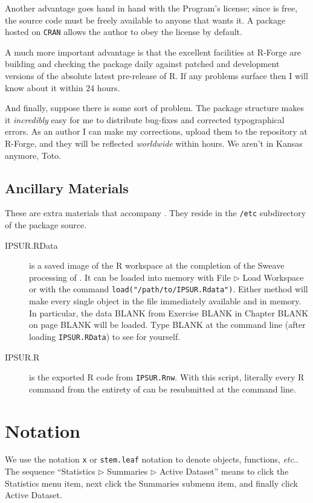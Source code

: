 \documentclass[captions=tableheading]{scrbook}
\begin{document}
Another advantage goes hand in hand with the Program's license; since \IPSUR is free, the source code must be freely available to anyone that wants it. A package hosted on \texttt{CRAN} allows the author to obey the license by default.

A much more important advantage is that the excellent facilities at \textsf{R}-Forge are building and checking the package daily against patched and development versions of the absolute latest pre-release of \textsf{R}. If any problems surface then I will know about it within 24 hours.

And finally, suppose there is some sort of problem. The package structure makes it \emph{incredibly} easy for me to distribute bug-fixes and corrected typographical errors. As an author I can make my corrections, upload them to the repository at \textsf{R}-Forge, and they will be reflected \emph{worldwide} within hours. We aren't in Kansas anymore, Toto.

\subsection*{Ancillary Materials}

These are extra materials that accompany \IPSUR. They reside in the \texttt{/etc} subdirectory of the package source. 

\begin{description}
\item[IPSUR.RData] is a saved image of the \textsf{R} workspace at the completion of the Sweave processing of \IPSUR. It can be loaded into memory with \textsf{File} $\triangleright$ \textsf{Load Workspace} or with the command \texttt{load("/path/to/IPSUR.Rdata")}. Either method will make every single object in the file immediately available and in memory. In particular, the data BLANK from Exercise BLANK in Chapter BLANK on page BLANK will be loaded. Type BLANK at the command line (after loading \texttt{IPSUR.RData}) to see for yourself.
\item[IPSUR.R] is the exported \textsf{R} code from \texttt{IPSUR.Rnw}. With this script, literally every \textsf{R} command from the entirety of \IPSUR can be resubmitted at the command line.
\end{description}

\section*{Notation}

We use the notation \texttt{x} or \texttt{stem.leaf} notation to denote objects, functions, \emph{etc}.. The sequence ``\textsf{Statistics} \textsf{$\triangleright$} \textsf{Summaries} \textsf{$\triangleright$} \textsf{Active Dataset}'' means to click the \textsf{Statistics} menu item, next click the \textsf{Summaries} submenu item, and finally click \textsf{Active Dataset}.
\end{document}
